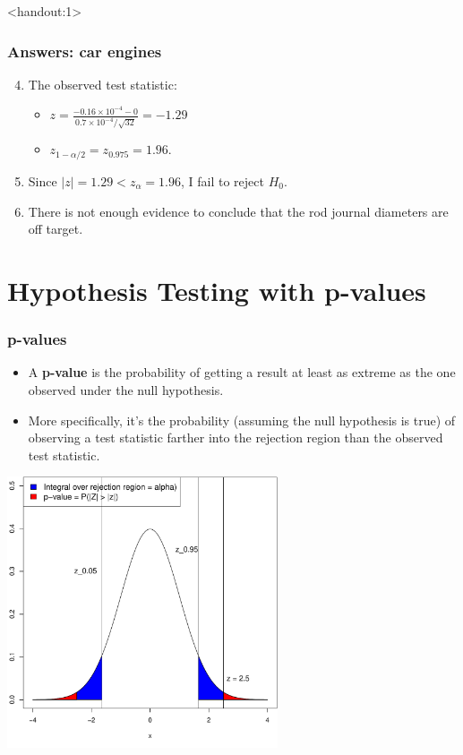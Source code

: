 \documentclass[handout]{beamer}\usepackage[]{graphicx}\usepackage[]{color}
\newenvironment{knitrout}{}{} %
\newcommand{\answers}{1}
\numberwithin{equation}{section}
\begin{document}
\begin{frame}<handout:\answers>
\frametitle{Answers: car engines}
\begin{enumerate}
\setcounter{enumi}{3}
\item The observed test statistic:
\begin{itemize}
\pause \item $z = \frac{-0.16 \times 10^{-4} - 0}{0.7 \times 10^{-4}/\sqrt{32}} = -1.29 $
\pause \item $z_{1-\alpha/2} = z_{0.975} = 1.96$.
\end{itemize}
\pause \item Since $|z| = 1.29 < z_\alpha = 1.96$, I fail to reject $H_0$.
\pause \item There is not enough evidence to conclude that the rod journal diameters are off target.
\end{enumerate}
\end{frame}







\section{Hypothesis Testing with p-values}


\begin{frame}[fragile]
\frametitle{p-values}
\begin{itemize}
\item A {\bf p-value} is the probability of getting a result at least as extreme as the one observed under the null hypothesis.
\pause \item More specifically, it's the probability (assuming the null hypothesis is true) of observing a test statistic farther into the rejection region than the observed test statistic.
\end{itemize}

\pause \begin{center}

\begin{knitrout}
\color{fgcolor}
\includegraphics[width=0.6\textwidth,height=0.6\textheight]{figure/unnamed-chunk-5-1} 

\end{knitrout}
\end{center}
\end{frame}
\end{document}
